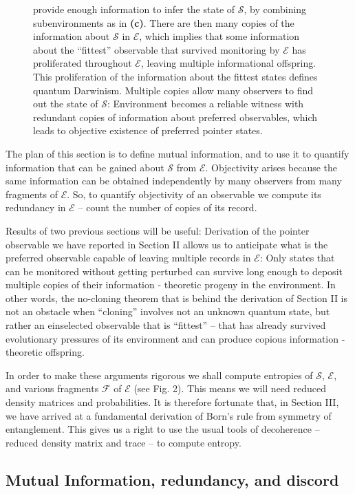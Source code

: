 \documentclass[aps,twocolumn,rmp,epsfig]{revtex4}
\newcommand{\Sys}{\ensuremath{\mathcal{S}}}
\newcommand{\cS}        {{\mathcal S}}
\newcommand{\cE}        {{\mathcal E}}
\newcommand{\+}         {\dagger}
\newcommand\cF{{\mathcal F}}
\begin{document}
\begin{figure}[tb]
{provide enough information to infer the state of $\Sys$, by combining subenvironments as in \textbf{(c)}.  
There are then many copies of the information about $\cS$ in $\cE$, which implies that some information 
about the ``fittest'' observable that survived monitoring by $\cE$ has proliferated throughout $\cE$, leaving multiple informational offspring. This proliferation of the information about the fittest states defines
quantum Darwinism. Multiple copies allow many observers to find out the state of $\cS$: Environment becomes a reliable witness with redundant copies of information about preferred
observables, which leads to objective existence of preferred pointer states.}
\label{EnvSubdivision}
\end{figure}

The plan of this section is to define mutual information, and to use it to quantify
information that can be gained about $\cS$ from $\cE$. Objectivity arises because the same information
can be obtained independently by many observers from many fragments of $\cE$. So, to
quantify objectivity of an observable we compute its redundancy in $\cE$ -- count the 
number of copies of its record. 

Results of two previous sections will be useful: Derivation of the pointer observable we have
reported in Section II allows us to anticipate what is the preferred observable capable of leaving
multiple records in $\cE$: Only states that can be monitored without getting perturbed can survive 
long enough to deposit multiple copies of their information - theoretic progeny in the environment. 
In other words, the no-cloning theorem that is behind the derivation of Section II is not an obstacle 
when ``cloning'' involves not an unknown quantum state, but rather an einselected observable that is 
``fittest'' -- that has already survived evolutionary pressures of its environment and can produce 
copious information - theoretic offspring.

In order to make these arguments rigorous we shall compute entropies of $\cS$, $\cE$, and various 
fragments $\cF$ of $\cE$ (see Fig. 2). This means we will need reduced density matrices and probabilities. It is
therefore fortunate that, in Section III, we have arrived at a fundamental derivation of Born's rule from
symmetry of entanglement. This gives us a right to use the usual tools of decoherence -- 
reduced density matrix and trace -- to compute entropy. 

\subsection{Mutual Information, redundancy, and discord}
\end{document}
